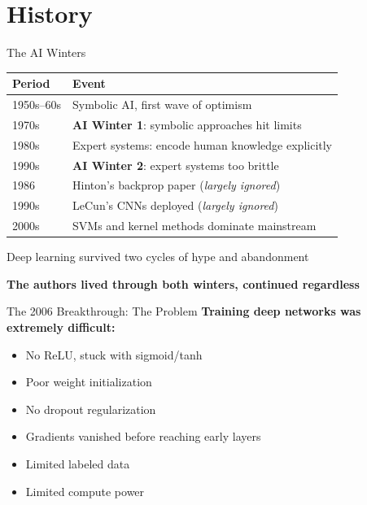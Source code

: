 \section{History}

\begin{frame}{The AI Winters}
    \begin{table}
        \centering
        \small
        \begin{tabular}{@{}ll@{}}
            \toprule
            \textbf{Period} & \textbf{Event} \\ \midrule
            1950s--60s & Symbolic AI, first wave of optimism \\
            1970s & \textbf{AI Winter 1}: symbolic approaches hit limits \\
            1980s & Expert systems: encode human knowledge explicitly \\
            1990s & \textbf{AI Winter 2}: expert systems too brittle \\
            1986 & Hinton's backprop paper (\textit{largely ignored}) \\
            1990s & LeCun's CNNs deployed (\textit{largely ignored}) \\
            2000s & SVMs and kernel methods dominate mainstream \\ \bottomrule
        \end{tabular}
    \end{table}
    
    \vspace{1em}
    Deep learning survived two cycles of hype and abandonment
    
    \textbf{The authors lived through both winters, continued regardless}
\end{frame}

\begin{frame}{The 2006 Breakthrough: The Problem}
    \textbf{Training deep networks was extremely difficult:}
    
    \vspace{1em}
    \begin{itemize}
        \item No ReLU, stuck with sigmoid/tanh
        \item Poor weight initialization
        \item No dropout regularization
        \item Gradients vanished before reaching early layers
        \item Limited labeled data
        \item Limited compute power
    \end{itemize}
\end{frame}

